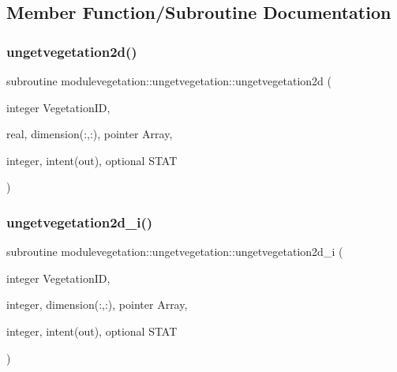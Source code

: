\subsection{Member Function/\+Subroutine Documentation}
\mbox{\label{interfacemodulevegetation_1_1ungetvegetation_a25dfbd901ee8f599092638eb93a00bb7}} 
\subsubsection{\texorpdfstring{ungetvegetation2d()}{ungetvegetation2d()}}
{\footnotesize\ttfamily subroutine modulevegetation\+::ungetvegetation\+::ungetvegetation2d (\begin{DoxyParamCaption}\item[{integer}]{Vegetation\+ID,  }\item[{real, dimension(\+:,\+:), pointer}]{Array,  }\item[{integer, intent(out), optional}]{S\+T\+AT }\end{DoxyParamCaption})\hspace{0.3cm}{\ttfamily [private]}}

\mbox{\label{interfacemodulevegetation_1_1ungetvegetation_aa4753fcc3e1d554bc42cbea4aecd1f23}} 
\subsubsection{\texorpdfstring{ungetvegetation2d\+\_\+i()}{ungetvegetation2d\_i()}}
{\footnotesize\ttfamily subroutine modulevegetation\+::ungetvegetation\+::ungetvegetation2d\+\_\+i (\begin{DoxyParamCaption}\item[{integer}]{Vegetation\+ID,  }\item[{integer, dimension(\+:,\+:), pointer}]{Array,  }\item[{integer, intent(out), optional}]{S\+T\+AT }\end{DoxyParamCaption})\hspace{0.3cm}{\ttfamily [private]}}

